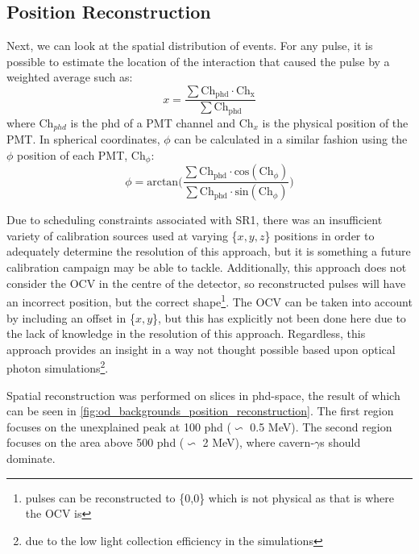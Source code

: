 



\subsection{Position Reconstruction}
\par
Next, we can look at the spatial distribution of events.
For any pulse, it is possible to estimate the location of the interaction that caused the pulse by a weighted average such as:
\begin{equation}
    x = \frac{\sum{\text{Ch}_{\text{phd}} \cdot \text{Ch}_\text{x}}}{\sum{\text{Ch}_\text{phd}}} 
\label{eq:OD_xy_position}
\end{equation}
where Ch$_{phd}$ is the phd of a PMT channel and Ch$_{x}$ is the physical position of the PMT.
In spherical coordinates, $\phi$ can be calculated in a similar fashion using the $\phi$ position of each PMT, Ch$_\phi$:
\begin{equation}
    \phi = \text{arctan}\bigg( \frac{\sum{\text{Ch}_\text{phd} \cdot \text{cos}(\text{Ch}_{\phi})}}{\sum{\text{Ch}_\text{phd} \cdot \text{sin}(\text{Ch}_{\phi})}} \bigg)
\label{eq:OD_phi_position}
\end{equation}
\par
Due to scheduling constraints associated with SR1, there was an insufficient variety of calibration sources used at varying \{$x,y,z$\} positions in order to adequately determine the resolution of this approach, but it is something a future calibration campaign may be able to tackle. 
Additionally, this approach does not consider the OCV in the centre of the detector, so reconstructed pulses will have an incorrect position, but the correct shape\footnote{pulses can be reconstructed to \{0,0\} which is not physical as that is where the OCV is}.
The OCV can be taken into account by including an offset in \{$x,y$\}, but this has explicitly not been done here due to the lack of knowledge in the resolution of this approach.
Regardless, this approach provides an insight in a way not thought possible based upon optical photon simulations\footnote{due to the low light collection efficiency in the simulations}.

\par
Spatial reconstruction was performed on slices in phd-space, the result of which can be seen in \autoref{fig:od_backgrounds_position_reconstruction}.
The first region focuses on the unexplained peak at 100 phd ($\backsim$ 0.5 MeV).
The second region focuses on the area above 500 phd ($\backsim$ 2 MeV), where cavern-$\gamma$s should dominate.

